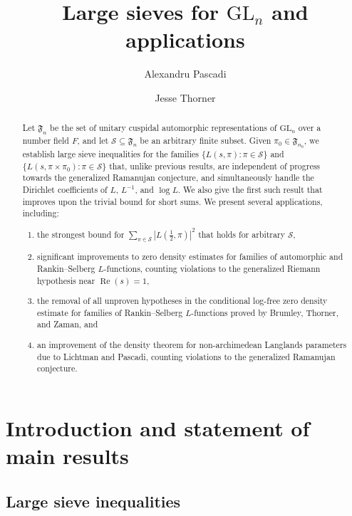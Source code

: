 \documentclass[11pt]{amsart}
\title{Large sieves for $\mathrm{GL}_n$ and applications}
\author{Alexandru Pascadi}
\author{Jesse Thorner}
\theoremstyle{remark}
\numberwithin{equation}{section}
\newcommand{\re}{\mathop{\mathrm{Re}}}
\begin{document}
\begin{abstract}
Let $\mathfrak{F}_n$ be the set of unitary cuspidal automorphic representations of $\mathrm{GL}_n$ over a number field $F$, and let $\mathcal{S}\subseteq\mathfrak{F}_n$ be an arbitrary finite subset. Given $\pi_0\in\mathfrak{F}_{n_0}$, we establish large sieve inequalities for the families $\{L(s,\pi)\colon \pi\in\mathcal{S}\}$ and $\{L(s,\pi\times\pi_0)\colon \pi\in\mathcal{S}\}$ that, unlike previous results, are independent of progress towards the generalized Ramanujan conjecture, and simultaneously handle the Dirichlet coefficients of $L$, $L^{-1}$, and $\log L$. We also give the first such result that improves upon the trivial bound for short sums.  We present several applications, including:
\begin{enumerate}[leftmargin=*]
    \item the strongest bound for $\sum_{\pi\in\mathcal{S}}|L(\frac{1}{2},\pi)|^2$ that holds for arbitrary $\mathcal{S}$,
    \item significant improvements to zero density estimates for families of automorphic and Rankin--Selberg $L$-functions, counting violations to the generalized Riemann hypothesis near $\re(s)=1$,
    \item the removal of all unproven hypotheses in the conditional log-free zero density estimate for families of Rankin--Selberg $L$-functions proved by Brumley, Thorner, and Zaman, and
    \item an improvement of the density theorem for non-archimedean Langlands parameters due to Lichtman and Pascadi, counting violations to the generalized Ramanujan conjecture.
\end{enumerate}
\end{abstract}

\maketitle

\vspace{-0.3cm}
\section{Introduction and statement of main results}
\label{sec:intro}

\subsection{Large sieve inequalities}
\end{document}
